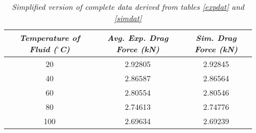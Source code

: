 	\begin{table}[H]
		\centering
		\begin{tabular}{|c|c|c|}
			\hline
			\hline
			\textit{Temperature of Fluid ($^\circ$C)} & \textit{Avg. Exp. Drag Force (kN)} & \textit{Sim. Drag Force (kN)}\\
			\hline
			\hline
			20 & 2.92805 & 2.92845 \\
			\hline
			40 & 2.86587 & 2.86564 \\
			\hline
			60 & 2.80554 & 2.80546 \\
			\hline
			80 & 2.74613 & 2.74776 \\
			\hline
			100 & 2.69634 & 2.69239 \\
			\hline
			\hline
		\end{tabular}
		\caption{\textit{Simplified version of complete data derived from tables \ref{expdat} and \ref{simdat}}}
		
	\end{table}

